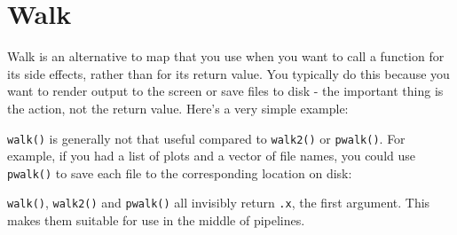 \documentclass[]{book}
\newenvironment{Shaded}{\begin{snugshade}}{\end{snugshade}}
\newcommand{\KeywordTok}[1]{\textcolor[rgb]{0.13,0.29,0.53}{\textbf{{#1}}}}
\newcommand{\DataTypeTok}[1]{\textcolor[rgb]{0.13,0.29,0.53}{{#1}}}
\newcommand{\DecValTok}[1]{\textcolor[rgb]{0.00,0.00,0.81}{{#1}}}
\newcommand{\StringTok}[1]{\textcolor[rgb]{0.31,0.60,0.02}{{#1}}}
\newcommand{\CommentTok}[1]{\textcolor[rgb]{0.56,0.35,0.01}{\textit{{#1}}}}
\newcommand{\NormalTok}[1]{{#1}}
\begin{document}
\section{Walk}\label{walk}

Walk is an alternative to map that you use when you want to call a
function for its side effects, rather than for its return value. You
typically do this because you want to render output to the screen or
save files to disk - the important thing is the action, not the return
value. Here's a very simple example:

\begin{Shaded}
\end{Shaded}

\texttt{walk()} is generally not that useful compared to
\texttt{walk2()} or \texttt{pwalk()}. For example, if you had a list of
plots and a vector of file names, you could use \texttt{pwalk()} to save
each file to the corresponding location on disk:

\begin{Shaded}
\end{Shaded}

\texttt{walk()}, \texttt{walk2()} and \texttt{pwalk()} all invisibly
return \texttt{.x}, the first argument. This makes them suitable for use
in the middle of pipelines.
\end{document}
